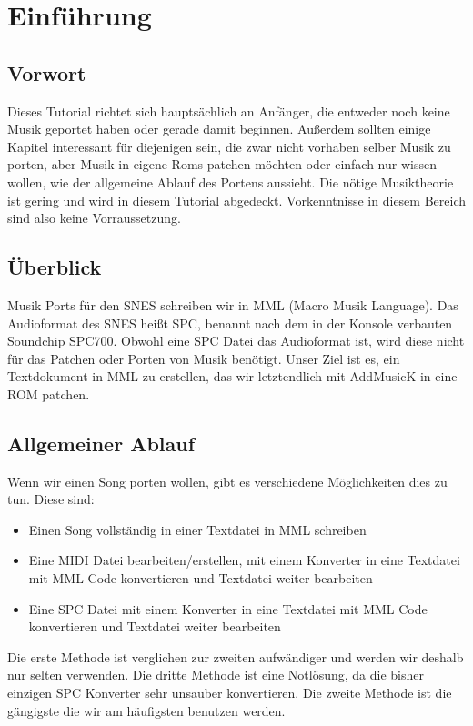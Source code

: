 

\section{Einführung}
\subsection{Vorwort}
Dieses Tutorial richtet sich hauptsächlich an Anfänger, die entweder noch keine Musik geportet haben oder gerade damit beginnen. Außerdem sollten einige Kapitel interessant für diejenigen sein, die zwar nicht vorhaben selber Musik zu porten, aber Musik in eigene Roms patchen möchten oder einfach nur wissen wollen, wie der allgemeine Ablauf des Portens aussieht.
Die nötige Musiktheorie ist gering und wird in diesem Tutorial abgedeckt. Vorkenntnisse in diesem Bereich sind also keine Vorraussetzung.

\newpage

\subsection{Überblick}

Musik Ports für den SNES schreiben wir in MML (Macro Musik Language). Das Audioformat des SNES heißt SPC, benannt nach dem in der Konsole verbauten Soundchip SPC700.
Obwohl eine SPC Datei das Audioformat ist, wird diese nicht für das Patchen oder Porten von Musik benötigt. Unser Ziel ist es, ein Textdokument in MML zu erstellen, das wir letztendlich mit AddMusicK in eine ROM patchen.


\subsection*{Allgemeiner Ablauf}
Wenn wir einen Song porten wollen, gibt es verschiedene Möglichkeiten dies zu tun. Diese sind:
\begin{itemize}
	\item Einen Song vollständig in einer Textdatei in MML schreiben
	\item Eine MIDI Datei bearbeiten/erstellen, mit einem Konverter in eine Textdatei mit MML Code konvertieren und Textdatei weiter bearbeiten
	\item Eine SPC Datei mit einem Konverter in eine Textdatei mit MML Code konvertieren und Textdatei weiter bearbeiten
\end{itemize}

\medskip

Die erste Methode ist verglichen zur zweiten aufwändiger und werden wir deshalb nur selten verwenden. Die dritte Methode ist eine Notlösung, da die bisher einzigen SPC Konverter sehr unsauber konvertieren. Die zweite Methode ist die gängigste die wir am häufigsten benutzen werden. \\

